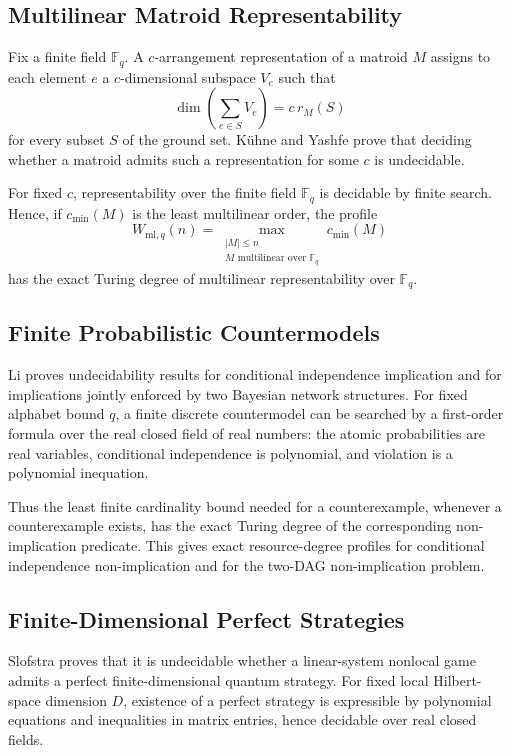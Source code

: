 \documentclass[11pt]{article}
\begin{document}
\subsection{Multilinear Matroid Representability}

Fix a finite field \(\mathbb F_q\). A \(c\)-arrangement representation of a matroid \(M\) assigns to each element \(e\) a \(c\)-dimensional subspace \(V_e\) such that
\[
\dim\left(\sum_{e\in S}V_e\right)=c\,r_M(S)
\]
for every subset \(S\) of the ground set. K\"uhne and Yashfe prove that deciding whether a matroid admits such a representation for some \(c\) is undecidable.

For fixed \(c\), representability over the finite field \(\mathbb F_q\) is decidable by finite search. Hence, if \(c_{\min}(M)\) is the least multilinear order, the profile
\[
W_{\mathrm{ml},q}(n)
=
\max_{\substack{|M|\le n\\M\text{ multilinear over }\mathbb F_q}}
c_{\min}(M)
\]
has the exact Turing degree of multilinear representability over \(\mathbb F_q\).

\subsection{Finite Probabilistic Countermodels}

Li proves undecidability results for conditional independence implication and for implications jointly enforced by two Bayesian network structures. For fixed alphabet bound \(q\), a finite discrete countermodel can be searched by a first-order formula over the real closed field of real numbers: the atomic probabilities are real variables, conditional independence is polynomial, and violation is a polynomial inequation.

Thus the least finite cardinality bound needed for a counterexample, whenever a counterexample exists, has the exact Turing degree of the corresponding non-implication predicate. This gives exact resource-degree profiles for conditional independence non-implication and for the two-DAG non-implication problem.

\subsection{Finite-Dimensional Perfect Strategies}

Slofstra proves that it is undecidable whether a linear-system nonlocal game admits a perfect finite-dimensional quantum strategy. For fixed local Hilbert-space dimension \(D\), existence of a perfect strategy is expressible by polynomial equations and inequalities in matrix entries, hence decidable over real closed fields.
\end{document}
